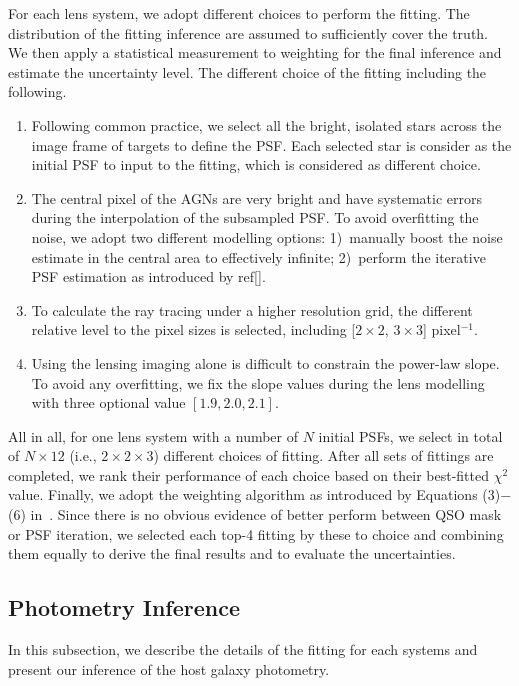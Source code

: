 \documentclass[fleqn,usenatbib]{mnras}
\begin{document}
For each lens system, we adopt different choices to perform the fitting. The distribution of the fitting inference are assumed to sufficiently cover the truth. We then apply a statistical measurement to weighting for the final inference and estimate the uncertainty level. The different choice of the fitting including the following.
\begin{enumerate}
\item Following common practice, we select all the bright, isolated stars across the image frame of targets to define the PSF. Each selected star is consider as the initial PSF to input to the fitting, which is considered as different choice.
\item The central pixel of the AGNs are very bright and have systematic errors during the interpolation of the subsampled PSF. To avoid overfitting the noise, we adopt two different modelling options: 1)~manually boost the noise estimate in the central area to effectively infinite; 2)~perform the iterative PSF estimation as introduced by ref[].
\item To calculate the ray tracing under a higher resolution grid, the different relative level to the pixel sizes is selected, including [$2\times2$, $3\times3$] pixel$^{-1}$.
\item Using the lensing imaging alone is difficult to constrain the power-law slope. To avoid any overfitting, we fix the slope values during the lens modelling with three optional value $[1.9, 2.0, 2.1]$.
\end{enumerate}

All in all, for one lens system with a number of $N$ initial PSFs, we select in total of $N\times12$ (i.e., $2 \times2 \times3$) different choices of fitting. After  all sets of fittings are completed, we rank their performance of each choice based on their best-fitted $\chi^2$ value. Finally, we adopt the weighting algorithm as introduced by Equations (3)$-$(6) in~\citet{Ding2020}. Since there is no obvious evidence of better perform between QSO mask or PSF iteration, we selected each top-4 fitting by these to choice and combining them equally to derive the final results and to evaluate the uncertainties.

\subsection{Photometry Inference}\label{sec:photometry}
In this subsection, we describe the details of the fitting for each systems and present our inference of the host galaxy photometry.
\end{document}
